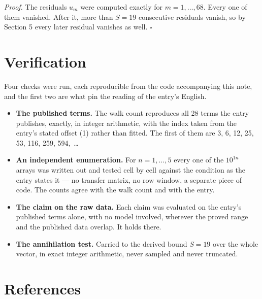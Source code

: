 \documentclass[11pt]{article}
\theoremstyle{definition}
\begin{document}
{\itshape Proof.} The residuals $u_m$ were computed exactly for $m = 1,\dots,68$. Every one of them vanished. After it, more than $S = 19$ consecutive residuals vanish, so by Section 5 every later residual vanishes as well. $\square$

\section{Verification}

Four checks were run, each reproducible from the code accompanying this note, and the first two are what pin the reading of the entry's English.

\begin{itemize}

\item {\bfseries The published terms.} The walk count reproduces all 28 terms the entry publishes, exactly, in integer arithmetic, with the index taken from the entry's stated offset (1) rather than fitted. The first of them are 3, 6, 12, 25, 53, 116, 259, 594,~\dots

\item {\bfseries An independent enumeration.} For $n = 1,\dots,5$ every one of the $10^{1n}$ arrays was written out and tested cell by cell against the condition as the entry states it --- no transfer matrix, no row window, a separate piece of code. The counts agree with the walk count and with the entry.

\item {\bfseries The claim on the raw data.} Each claim was evaluated on the entry's published terms alone, with no model involved, wherever the proved range and the published data overlap. It holds there.

\item {\bfseries The annihilation test.} Carried to the derived bound $S = 19$ over the whole vector, in exact integer arithmetic, never sampled and never truncated.

\end{itemize}

\section{References}
\end{document}

